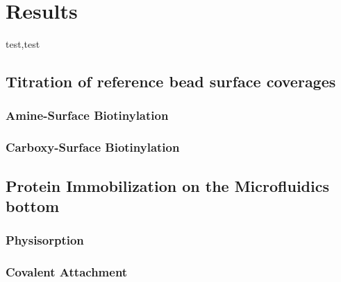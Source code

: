 \chapter{Results}
test,test

\section{Titration of reference bead surface coverages}

\subsection{Amine-Surface Biotinylation}

\subsection{Carboxy-Surface Biotinylation}
\section{Protein Immobilization on the Microfluidics bottom}

\subsection{Physisorption}

\subsection{Covalent Attachment}